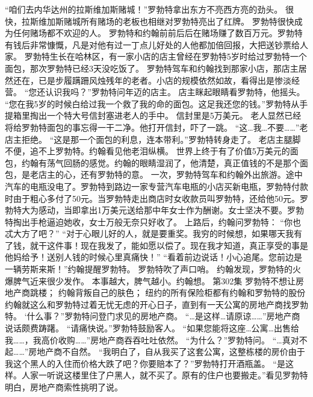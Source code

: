 \documentclass[a4paper,12pt,UTF8,twoside]{ctexbook}
\begin{document}
        “咱们去内华达州的拉斯维加斯赌城！”罗勃特拿出东方不亮西方亮的劲头。  
        很快，拉斯维加斯赌城所有赌场的老板也相继对罗勃特亮出了红牌。  
        罗勃特很快成为任何赌场都不欢迎的人。  
        罗勃特和约翰前前后后在赌场赚了数百万元。罗勃特有钱后非常慷慨，凡是对他有过一丁点儿好处的人他都加倍回报，大把送钞票给人家。  
        罗勃特生长在哈林区，有一家小店的店主曾经在罗勃特5岁时给过罗勃特一个面包，那次罗勃特已经3天没吃饭了。  
        罗勃特驾车和约翰找到那家小店，那店主居然还在，已是步履蹒跚风烛残年的老者。小店的规模依然如故，看得出是惨淡经营。  
        “您还认识我吗？”罗勃特问年迈的店主。  
        店主眯起眼睛看罗勃特，他摇头。  
        “您在我5岁的时候白给过我一个救了我的命的面包。这足我还您的钱。”罗勃特从手提箱里掏出一个特大号信封塞进老人的手中。  
        信封里是5万美元。  
        老人显然已经将给罗勃特面包的事忘得一干二净。他打开信封，吓了一跳。  
        “这…我…不要……”老店主拒绝。  
        “这是那一个面包的利息，连本带利。”罗勃特转身走了。  
        老店主腿脚不便，追不上罗勃特。约翰看见他老泪纵横。  
        世界上终于有了价值5万美元的面包，约翰有荡气回肠的感觉。约翰的眼睛湿润了，他清楚，真正值钱的不是那个面包，是老店主的心，还有罗勃特的意。  
        一次，罗勃特驾车和约翰外出旅游。途中汽车的电瓶没电了。罗勃特到路边一家专营汽车电瓶的小店买新电瓶，罗勃特付款时由于粗心多付了50元。当罗勃特走出商店时女收款员叫罗勃特，还给他50元。罗勃特大为感动，当即拿出1万美元送给那中年女士作为酬谢。女士坚决不要。罗勃特掏出手枪逼迫她收，女士万般无奈只好收了。  
        上路后，约翰问罗勃特：  
        “你也忒大方了吧？”  
        “对于心眼儿好的人，就是要重奖。我穷的时候想，如果哪天我有了钱，就干这件事！现在我发了，能如愿以偿了。现在我才知道，真正享受的事是他妈给予！送别人钱的时候心里真痛快！”  
        “看着前边说话！小心追尾。您前边是一辆劳斯来斯！”约翰提醒罗勃特。  
        罗勃特吹了声口哨。  
        约翰发现，罗勃特的火爆脾气近来很少发作。  
        本事越大，脾气越小。约翰想。          第302集  
        罗勃特不想让房地产商跳楼；  
        约翰背叛自己的肤色；  
        纽约的所有保险柜都有约翰和罗勃特的股份    
        约翰就这么和罗勃特过着无忧无虑的开心日子，直到有一天公寓的房地产商找罗勃特。  
        ‘什么事？”罗勃特问登门求见的房地产商。  
        “…是这样…请原谅……”房地产商说话颇费踌躇。  
        “请痛快说。”罗勃特鼓励客人。  
        “如果您能将这座…公寓…出售给我……，我高价收购……”房地产商吞吞吐吐依然。  
        “为什么？”罗勃特问。  
        “…真对不起……”房地产商不自然。  
        “我明白了，自从我买了这套公寓，这整栋楼的房价由于我这个黑人的入住而价格大跌了吧？你要赔本了？”罗勃特打开酒瓶盖。  
        “是这样。人家一听说这楼里住了户黑人，就不买了。原有的住户也要搬走。”看见罗勃特明白，房地产商索性挑明了说。  
\end{document}
